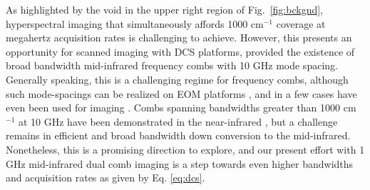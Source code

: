 \documentclass[aip,reprint]{revtex4-1}
\begin{document}
As highlighted by the void in the upper right region of \mbox{Fig. \ref{fig:bckgnd}}, hyperspectral imaging that simultaneously affords 1000 cm$^{-1}$ coverage at megahertz acquisition rates is challenging to achieve. However, this presents an opportunity for scanned imaging with DCS platforms, provided the existence of broad bandwidth mid-infrared frequency combs with 10 GHz mode spacing. Generally speaking, this is a challenging regime for frequency combs, although such mode-spacings can be realized on EOM platforms  \cite{kowligyMidinfraredFrequencyCombs2020}, and in a few cases have even been used for imaging \cite{ullahkhanDirectHyperspectralDualcomb2020,khanSubGHzOpticalResolution2023}. Combs spanning bandwidths greater than 1000 cm$^{-1}$ at 10 GHz have been demonstrated in the near-infrared \cite{carlsonBroadbandElectroopticDualcomb2020}, but a  challenge remains in efficient and broad bandwidth down conversion to the mid-infrared\cite{kowligyMidinfraredFrequencyCombs2020}. Nonetheless, this is a promising direction to explore, and our present effort with 1 GHz mid-infrared dual comb imaging is a step towards even higher bandwidths and acquisition rates as given by Eq. \ref{eq:dcs}. 







\end{document}
